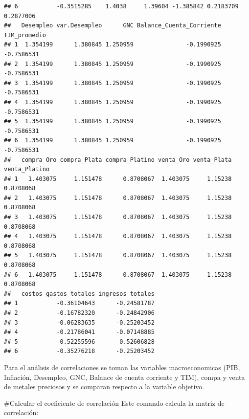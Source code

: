 \documentclass[
  11pt,
  a4paper,
]{book}
\begin{document}
\begin{verbatim}
## 6           -0.3515285    1.4038     1.39604 -1.385842 0.2183709 0.2877006
##   Desempleo var.Desempleo      GNC Balance_Cuenta_Corriente TIM_promedio
## 1  1.354199      1.380845 1.250959               -0.1990925   -0.7586531
## 2  1.354199      1.380845 1.250959               -0.1990925   -0.7586531
## 3  1.354199      1.380845 1.250959               -0.1990925   -0.7586531
## 4  1.354199      1.380845 1.250959               -0.1990925   -0.7586531
## 5  1.354199      1.380845 1.250959               -0.1990925   -0.7586531
## 6  1.354199      1.380845 1.250959               -0.1990925   -0.7586531
##   compra_Oro compra_Plata compra_Platino venta_Oro venta_Plata venta_Platino
## 1   1.403075     1.151478      0.8708067  1.403075     1.15238     0.8708068
## 2   1.403075     1.151478      0.8708067  1.403075     1.15238     0.8708068
## 3   1.403075     1.151478      0.8708067  1.403075     1.15238     0.8708068
## 4   1.403075     1.151478      0.8708067  1.403075     1.15238     0.8708068
## 5   1.403075     1.151478      0.8708067  1.403075     1.15238     0.8708068
## 6   1.403075     1.151478      0.8708067  1.403075     1.15238     0.8708068
##   costos_gastos_totales ingresos_totales
## 1           -0.36104643      -0.24581787
## 2           -0.16782320      -0.24842906
## 3           -0.06283635      -0.25203452
## 4           -0.21786041      -0.07148885
## 5            0.52255596       0.52606828
## 6           -0.35276218      -0.25203452
\end{verbatim}

Para el análisis de correlaciones se toman las variables macroeconomicas
(PIB, Inflación, Desempleo, GNC, Balance de cuenta corriente y TIM),
compa y venta de metales preciosos y se comparan respecto a la variable
objetivo.

\#Calcular el coeficiente de correlación Este comando calcula la matriz
de correlación:
\end{document}
